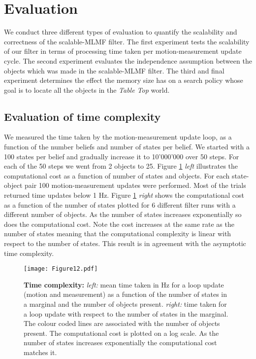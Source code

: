 \documentclass[review]{elsarticle}
\numberwithin{equation}{section}
\begin{document}
\section{Evaluation}

We conduct three different types of evaluation to quantify the scalability and correctness of the scalable-MLMF filter. The first experiment
tests the scalability of our filter in terms of processing time taken per motion-measurement update cycle. The second experiment evaluates the independence 
assumption between the objects which was made in the scalable-MLMF filter. The third and final experiment determines the effect the memory size has 
on a search policy whose goal is to locate all the objects in the \textit{Table Top} world.

\subsection{Evaluation of time complexity}

We measured the time taken by the motion-measurement update loop, as a function of the number beliefs and number of states per belief. 
We started with a 100 states per belief and gradually increase it to 10'000'000 over 50 steps. For each of the 50 steps we went from 2 objects to 25. Figure \ref{fig:time_complexity} \textit{left} illustrates the computational
cost as a function of number of states and objects. For each state-object pair 100 motion-measurement updates were performed. Most of the trials returned time updates 
below 1 Hz. Figure \ref{fig:time_complexity} \textit{right} shows the computational cost as a function of the number of states plotted for 6 different filter runs with
a different number of objects. As the number of states increases exponentially so does the computational cost. Note the cost increases at the same
rate as the number of states meaning that the computational complexity is linear with respect to the number of states. This result is in agreement with 
the asymptotic time complexity.

\begin{figure}
 \texttt{[image: Figure12.pdf]}
 \caption{\textbf{Time complexity:} \textit{left:} mean time taken in Hz for a loop update (motion and measurement) as a function of the number of states in a marginal and the 
 number of objects present. \textit{right:} time taken for a loop update with respect to the number of states in the marginal. The colour coded lines are 
 associated with the number of objects present. The computational cost is plotted on a log scale. As the number of states increases exponentially the
 computational cost matches it.}
 \label{fig:time_complexity}
\end{figure}
\end{document}
